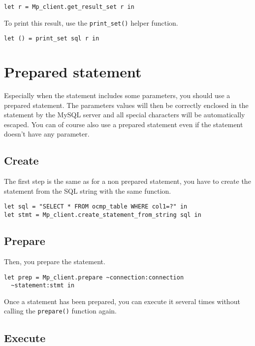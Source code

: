 \documentclass[a4paper, english, 11pt]{article}
\begin{document}
\begin{verbatim}
let r = Mp_client.get_result_set r in
\end{verbatim}

To print this result, use the \texttt{print\_set()} helper function.

\begin{verbatim}
let () = print_set sql r in 
\end{verbatim}

\section{Prepared statement}

Especially when the statement includes some parameters, you should use a prepared statement. The parameters values will then be correctly enclosed in the statement by the MySQL server and all special characters will be automatically escaped. You can of course also use a prepared statement even if the statement doesn't have any parameter.

\subsection{Create}

The first step is the same as for a non prepared statement, you have to create the statement from the SQL string with the same function.

\begin{verbatim}
let sql = "SELECT * FROM ocmp_table WHERE col1=?" in
let stmt = Mp_client.create_statement_from_string sql in
\end{verbatim}

\subsection{Prepare}

Then, you prepare the statement.

\begin{verbatim}
let prep = Mp_client.prepare ~connection:connection
  ~statement:stmt in
\end{verbatim}

Once a statement has been prepared, you can execute it several times without calling the \texttt{prepare()} function again. 

\subsection{Execute}
\end{document}
